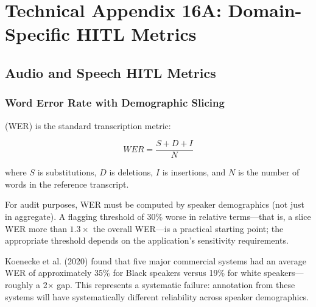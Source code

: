 
\chapter*{Technical Appendix 16A: Domain-Specific HITL Metrics}
\label{app:ch16}

\apxnumon
\section{Audio and Speech HITL Metrics}

\subsection{Word Error Rate with Demographic Slicing}

 (WER) is the standard transcription metric:

\begin{equation}
WER = \frac{S + D + I}{N}
\label{eq:wer}
\end{equation}

where $S$ is substitutions, $D$ is deletions, $I$ is insertions, and $N$ is the number of words in the reference transcript.

For \hitl audit purposes, WER must be computed by speaker demographics (not just in aggregate). A flagging threshold of 30\% worse in relative terms---that is, a slice WER more than $1.3\times$ the overall WER---is a practical starting point; the appropriate threshold depends on the application's sensitivity requirements.

\begin{technote}
Koenecke et al. (2020) found that five major commercial \asr systems had an average WER of approximately 35\% for Black speakers versus 19\% for white speakers---roughly a 2$\times$ gap. This represents a systematic \hitl failure: annotation from these systems will have systematically different reliability across speaker demographics.
\end{technote}

